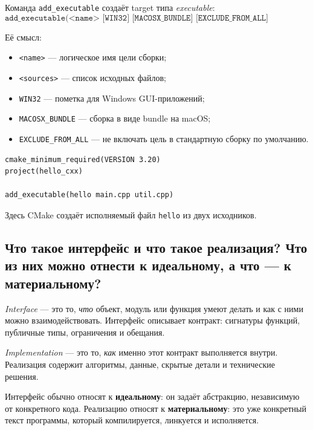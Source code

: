 \begin{definition}
Команда \texttt{add\_executable} создаёт target типа \textit{executable}:
\[
\texttt{add\_executable(<name> [WIN32] [MACOSX\_BUNDLE] [EXCLUDE\_FROM\_ALL] <sources>...)}
\]
\end{definition}

Её смысл:
\begin{itemize}
    \item \texttt{<name>} — логическое имя цели сборки;
    \item \texttt{<sources>} — список исходных файлов;
    \item \texttt{WIN32} — пометка для Windows GUI-приложений;
    \item \texttt{MACOSX\_BUNDLE} — сборка в виде bundle на macOS;
    \item \texttt{EXCLUDE\_FROM\_ALL} — не включать цель в стандартную сборку по умолчанию.
\end{itemize}

\begin{example}
\begin{verbatim}
cmake_minimum_required(VERSION 3.20)
project(hello_cxx)

add_executable(hello main.cpp util.cpp)
\end{verbatim}

Здесь CMake создаёт исполняемый файл \texttt{hello} из двух исходников.
\end{example}

\subsection{Что такое интерфейс и что такое реализация? Что из них можно отнести к идеальному, а что — к материальному?}
\begin{definition}[Интерфейс]
\textit{Interface} — это то, \emph{что} объект, модуль или функция умеют делать и как с ними можно взаимодействовать. Интерфейс описывает контракт: сигнатуры функций, публичные типы, ограничения и обещания.
\end{definition}

\begin{definition}[Реализация]
\textit{Implementation} — это то, \emph{как} именно этот контракт выполняется внутри. Реализация содержит алгоритмы, данные, скрытые детали и технические решения.
\end{definition}

Интерфейс обычно относят к \textbf{идеальному}: он задаёт абстракцию, независимую от конкретного кода. Реализацию относят к \textbf{материальному}: это уже конкретный текст программы, который компилируется, линкуется и исполняется.

